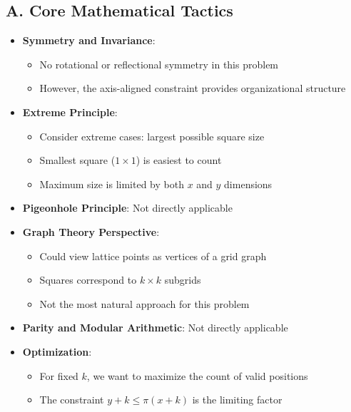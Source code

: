\documentclass[12pt]{article}
\begin{document}
\begin{tacticalbox}
\subsection*{A. Core Mathematical Tactics}
\begin{itemize}[leftmargin=*]
    \item \textbf{Symmetry and Invariance}: 
    \begin{itemize}
        \item No rotational or reflectional symmetry in this problem
        \item However, the axis-aligned constraint provides organizational structure
    \end{itemize}
    
    \item \textbf{Extreme Principle}: 
    \begin{itemize}
        \item Consider extreme cases: largest possible square size
        \item Smallest square ($1 \times 1$) is easiest to count
        \item Maximum size is limited by both $x$ and $y$ dimensions
    \end{itemize}
    
    \item \textbf{Pigeonhole Principle}: Not directly applicable
    
    \item \textbf{Graph Theory Perspective}: 
    \begin{itemize}
        \item Could view lattice points as vertices of a grid graph
        \item Squares correspond to $k \times k$ subgrids
        \item Not the most natural approach for this problem
    \end{itemize}
    
    \item \textbf{Parity and Modular Arithmetic}: Not directly applicable
    
    \item \textbf{Optimization}: 
    \begin{itemize}
        \item For fixed $k$, we want to maximize the count of valid positions
        \item The constraint $y + k \leq \pi(x+k)$ is the limiting factor
    \end{itemize}
\end{itemize}


\end{tacticalbox}
\end{document}

